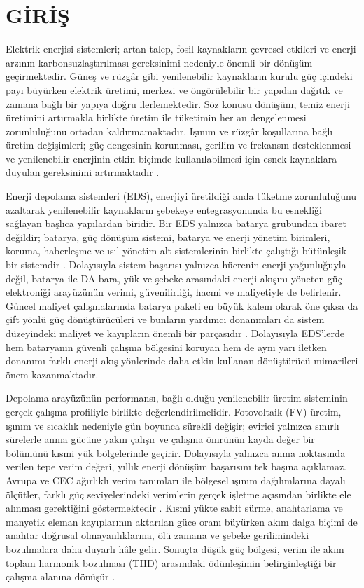 \chapter{GİRİŞ}
\label{chap:giris}

Elektrik enerjisi sistemleri; artan talep, fosil kaynakların çevresel etkileri ve enerji arzının karbonsuzlaştırılması gereksinimi nedeniyle önemli bir dönüşüm geçirmektedir. Güneş ve rüzgâr gibi yenilenebilir kaynakların kurulu güç içindeki payı büyürken elektrik üretimi, merkezi ve öngörülebilir bir yapıdan dağıtık ve zamana bağlı bir yapıya doğru ilerlemektedir. Söz konusu dönüşüm, temiz enerji üretimini artırmakla birlikte üretim ile tüketimin her an dengelenmesi zorunluluğunu ortadan kaldırmamaktadır. Işınım ve rüzgâr koşullarına bağlı üretim değişimleri; güç dengesinin korunması, gerilim ve frekansın desteklenmesi ve yenilenebilir enerjinin etkin biçimde kullanılabilmesi için esnek kaynaklara duyulan gereksinimi artırmaktadır \citep{Chen2009,Aneke2016,IEAPVPS2024}.

Enerji depolama sistemleri (EDS), enerjiyi üretildiği anda tüketme zorunluluğunu azaltarak yenilenebilir kaynakların şebekeye entegrasyonunda bu esnekliği sağlayan başlıca yapılardan biridir. Bir EDS yalnızca batarya grubundan ibaret değildir; batarya, güç dönüşüm sistemi, batarya ve enerji yönetim birimleri, koruma, haberleşme ve ısıl yönetim alt sistemlerinin birlikte çalıştığı bütünleşik bir sistemdir \citep{Hannan2017,Plett2015}. Dolayısıyla sistem başarısı yalnızca hücrenin enerji yoğunluğuyla değil, batarya ile DA bara, yük ve şebeke arasındaki enerji akışını yöneten güç elektroniği arayüzünün verimi, güvenilirliği, hacmi ve maliyetiyle de belirlenir. Güncel maliyet çalışmalarında batarya paketi en büyük kalem olarak öne çıksa da çift yönlü güç dönüştürücüleri ve bunların yardımcı donanımları da sistem düzeyindeki maliyet ve kayıpların önemli bir parçasıdır \citep{Ramasamy2023,Lazard2024}. Dolayısıyla EDS'lerde hem bataryanın güvenli çalışma bölgesini koruyan hem de aynı yarı iletken donanımı farklı enerji akış yönlerinde daha etkin kullanan dönüştürücü mimarileri önem kazanmaktadır.

Depolama arayüzünün performansı, bağlı olduğu yenilenebilir üretim sisteminin gerçek çalışma profiliyle birlikte değerlendirilmelidir. Fotovoltaik (FV) üretim, ışınım ve sıcaklık nedeniyle gün boyunca sürekli değişir; evirici yalnızca sınırlı sürelerle anma gücüne yakın çalışır ve çalışma ömrünün kayda değer bir bölümünü kısmi yük bölgelerinde geçirir. Dolayısıyla yalnızca anma noktasında verilen tepe verim değeri, yıllık enerji dönüşüm başarısını tek başına açıklamaz. Avrupa ve CEC ağırlıklı verim tanımları ile bölgesel ışınım dağılımlarına dayalı ölçütler, farklı güç seviyelerindeki verimlerin gerçek işletme açısından birlikte ele alınması gerektiğini göstermektedir \citep{Meinhardt2000,Sera2008,Sandia2015,Ongun2013}. Kısmi yükte sabit sürme, anahtarlama ve manyetik eleman kayıplarının aktarılan güce oranı büyürken akım dalga biçimi de anahtar doğrusal olmayanlıklarına, ölü zamana ve şebeke gerilimindeki bozulmalara daha duyarlı hâle gelir. Sonuçta düşük güç bölgesi, verim ile akım toplam harmonik bozulması (THD) arasındaki ödünleşimin belirginleştiği bir çalışma alanına dönüşür \citep{Kjaer2005,Chicco2009}.

